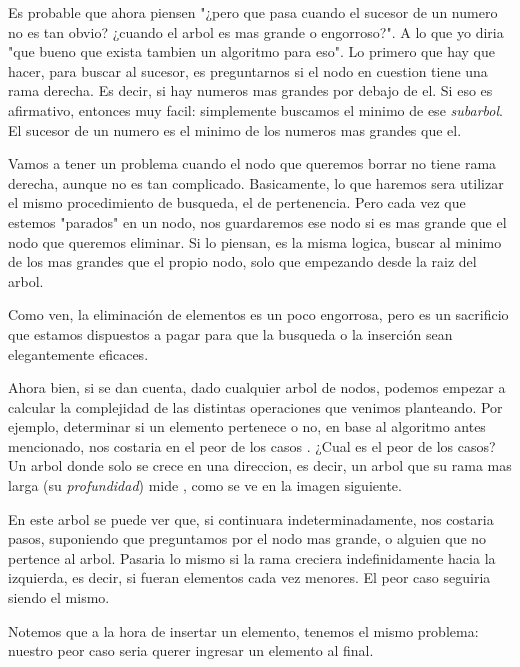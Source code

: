 \documentclass{article}
\begin{document}
\begin{multicols}{3}


\end{multicols}

Es probable que ahora piensen "¿pero que pasa cuando el sucesor de un numero no es tan obvio? ¿cuando el arbol es mas grande o engorroso?". A lo que yo diria "que bueno que exista tambien un algoritmo para eso". Lo primero que hay que hacer, para buscar al sucesor, es preguntarnos si el nodo en cuestion tiene una rama derecha. Es decir, si hay numeros mas grandes por debajo de el. Si eso es afirmativo, entonces muy facil: simplemente buscamos el minimo de ese \textit{subarbol}. El sucesor de un numero es el minimo de los numeros mas grandes que el.

Vamos a tener un problema cuando el nodo que queremos borrar no tiene rama derecha, aunque no es tan complicado. Basicamente, lo que haremos sera utilizar el mismo procedimiento de busqueda, el de pertenencia. Pero cada vez que estemos "parados" en un nodo, nos guardaremos ese nodo si es mas grande que el nodo que queremos eliminar. Si lo piensan, es la misma logica, buscar al minimo de los mas grandes que el propio nodo, solo que empezando desde la raiz del arbol.

Como ven, la eliminación de elementos es un poco engorrosa, pero es un sacrificio que estamos dispuestos a pagar para que la busqueda o la inserción sean elegantemente eficaces.

Ahora bien, si se dan cuenta, dado cualquier arbol de  nodos, podemos empezar a calcular la complejidad de las distintas operaciones que venimos planteando. Por ejemplo, determinar si un elemento pertenece o no, en base al algoritmo antes mencionado, nos costaria en el peor de los casos . ¿Cual es el peor de los casos? Un arbol donde solo se crece en una direccion, es decir, un arbol que su rama mas larga (su \textit{profundidad}) mide , como se ve en la imagen siguiente.

\begin{multicols}{2}
	En este arbol se puede ver que, si continuara indeterminadamente, nos costaria  pasos, suponiendo que preguntamos por el nodo mas grande, o alguien que no pertence al arbol. Pasaria lo mismo si la rama creciera indefinidamente hacia la izquierda, es decir, si fueran elementos cada vez menores. El peor caso seguiria siendo el mismo.
	
	Notemos que a la hora de insertar un elemento, tenemos el mismo problema: nuestro peor caso seria querer ingresar un elemento al final.

\end{multicols}
\end{document}
